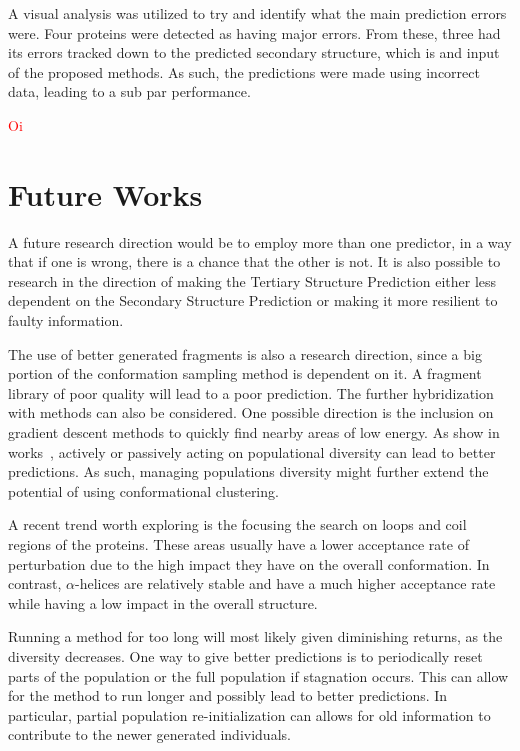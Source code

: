 A visual analysis was utilized to try and identify what the main prediction
errors were. Four proteins were detected as having major errors. From these,
three had its errors tracked down to the predicted secondary structure, which is
and input of the proposed methods. As such, the predictions were made using
incorrect data, leading to a sub par performance.

\textcolor{red}{
Oi
}

\section{Future Works}\label{sec:future_works}

A future research direction
would be to employ more than one predictor, in a way that if one is wrong,
there is a chance that the other is not. It is also possible to research in the
direction of making the Tertiary Structure Prediction either less dependent on
the Secondary Structure Prediction or making it more resilient to faulty
information.

The use of better generated fragments is also a research direction, since a big
portion of the conformation sampling method is dependent on it. A fragment
library of poor quality will lead to a poor prediction.
The further hybridization with methods can also be considered. One possible
direction is the inclusion on gradient descent methods to quickly find nearby
areas of low energy.
As show in works~,
actively or passively acting on populational diversity can lead to
better predictions. As such, managing populations diversity might further
extend the potential of using conformational clustering.

A recent trend worth exploring is the focusing the search on loops and coil
regions of the proteins. These areas usually have a lower acceptance rate of
perturbation due to the high impact they have on the overall conformation.  In
contrast, $\alpha$-helices are relatively stable and have a much higher
acceptance rate while having a low impact in the overall structure.

Running a method for too long will most likely given diminishing returns, as
the diversity decreases. One way to give better predictions is to periodically
reset parts of the population or the full population if stagnation occurs. This
can allow for the method to run longer and possibly lead to better predictions.
In particular, partial population re-initialization can allows for old information
to contribute to the newer generated individuals.

